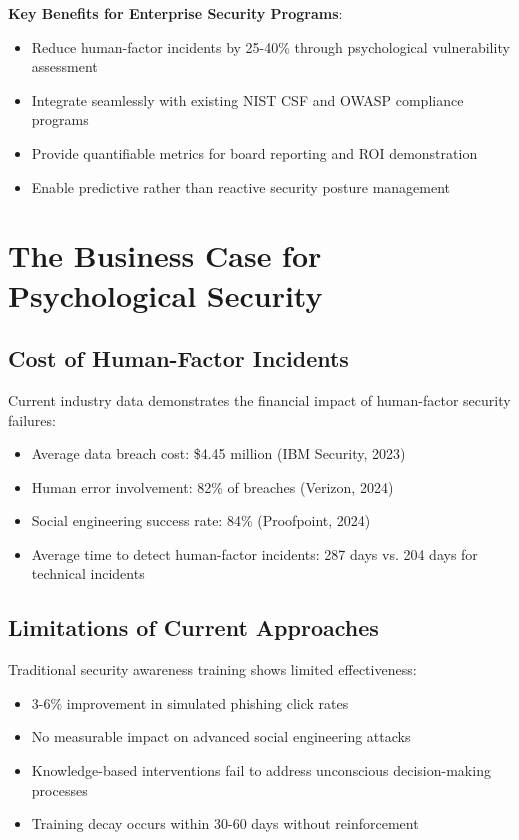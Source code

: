 \documentclass[11pt,a4paper]{article}
\begin{document}
\textbf{Key Benefits for Enterprise Security Programs}:
\begin{itemize}
\item Reduce human-factor incidents by 25-40\% through psychological vulnerability assessment
\item Integrate seamlessly with existing NIST CSF and OWASP compliance programs
\item Provide quantifiable metrics for board reporting and ROI demonstration
\item Enable predictive rather than reactive security posture management
\end{itemize}

\section{The Business Case for Psychological Security}

\subsection{Cost of Human-Factor Incidents}

Current industry data demonstrates the financial impact of human-factor security failures:

\begin{itemize}
\item Average data breach cost: \$4.45 million (IBM Security, 2023)
\item Human error involvement: 82\% of breaches (Verizon, 2024)
\item Social engineering success rate: 84\% (Proofpoint, 2024)
\item Average time to detect human-factor incidents: 287 days vs. 204 days for technical incidents
\end{itemize}

\subsection{Limitations of Current Approaches}

Traditional security awareness training shows limited effectiveness:
\begin{itemize}
\item 3-6\% improvement in simulated phishing click rates
\item No measurable impact on advanced social engineering attacks
\item Knowledge-based interventions fail to address unconscious decision-making processes
\item Training decay occurs within 30-60 days without reinforcement
\end{itemize}
\end{document}
